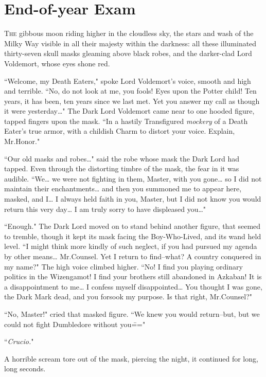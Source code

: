 \chapter{End-of-year Exam}

\lettrine{T}{he} gibbous moon riding higher in the cloudless sky, the stars and wash of the Milky Way visible in all their majesty within the darkness: all these illuminated thirty-seven skull masks gleaming above black robes, and the darker-clad Lord Voldemort, whose eyes shone red.

``Welcome, my Death Eaters," spoke Lord Voldemort's voice, smooth and high and terrible. ``No, do not look at me, you fools! Eyes upon the Potter child! Ten years, it has been, ten years since we last met. Yet you answer my call as though it were yesterday{\ldots}" The Dark Lord Voldemort came near to one hooded figure, tapped fingers upon the mask. ``In a hastily Transfigured \emph{mockery} of a Death Eater's true armor, with a childish Charm to distort your voice. Explain, Mr.\?Honor."

``Our old masks and robes{\ldots}" said the robe whose mask the Dark Lord had tapped. Even through the distorting timbre of the mask, the fear in it was audible. ``We{\ldots} we were not fighting in them, Master, with you gone{\ldots} so I did not maintain their enchantments{\ldots} and then you summoned me to appear here, masked, and I{\ldots} I always held faith in you, Master, but I did not know you would return this very day{\ldots} I am truly sorry to have displeased you{\ldots}"

``Enough." The Dark Lord moved on to stand behind another figure, that seemed to tremble, though it kept its mask facing the Boy-Who-Lived, and its wand held level. ``I might think more kindly of such neglect, if you had pursued my agenda by other means{\ldots} Mr.\?Counsel. Yet I return to find\---what? A country conquered in my name?" The high voice climbed higher. ``No! I find you playing ordinary politics in the Wizengamot! I find your brothers still abandoned in Azkaban! It is a disappointment to me{\ldots} I confess myself disappointed{\ldots} You thought I was gone, the Dark Mark dead, and you forsook my purpose. Is that right, Mr.\?Counsel?"

``No, Master!" cried that masked figure. ``We knew you would return\---but, but we could not fight Dumbledore without you\==="

``\emph{Crucio.}"

A horrible scream tore out of the mask, piercing the night, it continued for long, long seconds.

